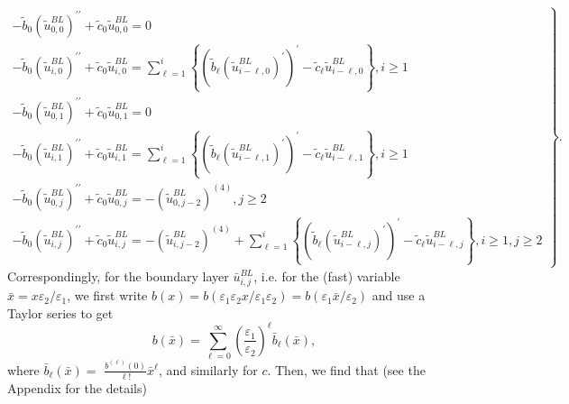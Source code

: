 \documentclass[12pt]{article}
\begin{document}
\begin{equation}
\left. 
\begin{array}{c}
-\tilde{b}_{0}\left(\tilde{u}^{BL}_{0,0}\right)^{\prime \prime }+\tilde{c}_{0}\tilde{u}^{BL}_{0,0}=0 \\
-\tilde{b}_{0}\left(\tilde{u}^{BL}_{i,0}\right)^{\prime \prime }+\tilde{c}_{0}\tilde{u}^{BL}_{i,0}=%
\sum_{\ell =1}^{i}\left\{ \left( \tilde{b}_{\ell }%
\left(\tilde{u}^{BL}_{i-\ell ,0}\right)^{\prime }\right) ^{\prime }-\tilde{c}_{\ell }\tilde{u}^{BL}_{i-\ell ,0}\right\} ,i\geq 1 \\
-\tilde{b}_{0}\left(\tilde{u}^{BL}_{0,1}\right)^{\prime \prime }+\tilde{c}_{0}\tilde{u}^{BL}_{0,1}=0 \\
-\tilde{b}_{0}\left(\tilde{u}^{BL}_{i,1}\right)^{\prime \prime }+\tilde{c}_{0}\tilde{u}^{BL}_{i,1}=%
\sum_{\ell =1}^{i}\left\{ \left( \tilde{b}_{\ell }\left(\tilde{u}^{BL}_{i-\ell ,1}\right)^{\prime }\right) ^{\prime }-\tilde{c}_{\ell }\tilde{u}^{BL}_{i-\ell ,1}\right\} ,i\geq 1 \\
-\tilde{b}_{0}\left(\tilde{u}^{BL}_{0,j}\right)^{\prime \prime }+\tilde{c}_{0}\tilde{u}^{BL}_{0,j}=-\left(\tilde{u}^{BL}_{0,j-2}\right)^{(4)},j\geq 2 \\
-\tilde{b}_{0}\left(\tilde{u}^{BL}_{i,j}\right)^{\prime \prime }+\tilde{c}_{0}\tilde{u}^{BL}_{i,j}=-\left(\tilde{u}^{BL}_{i,j-2}\right)^{(4)}+\sum_{\ell =1}^{i}\left\{ \left( \tilde{b}_{\ell }%
\left(\tilde{u}^{BL}_{i-\ell ,j}\right)^{\prime }\right) ^{\prime }-\tilde{c}_{\ell }\tilde{u}^{BL}_{i-\ell ,j}\right\} ,i\geq 1,j\geq 2%
\end{array}%
\right\}.  \label{ut_ij}
\end{equation}
%
Correspondingly, for the boundary layer $\bar{u}_{i,j}^{BL}$, i.e. for the (fast)
variable $\bar{x}=x\varepsilon _{2}/\varepsilon _{1}$, we first write 
$b(x)=b(\varepsilon _{1}\varepsilon _{2}x/\varepsilon
_{1}\varepsilon _{2})=b(\varepsilon _{1}\bar{x}/\varepsilon _{2})$ and use a Taylor
series to get
%
\begin{equation*}
b(\bar{x})=\sum_{\ell =0}^{\infty } \left( \frac{\varepsilon _{1}}{\varepsilon _{2}}\right) ^{\ell }\bar{b}_{\ell }(\bar{x}),
\end{equation*}
%
where $\bar{b}_{\ell }(\bar{x})=$ $\frac{b^{(\ell )}(0)}{\ell !}\bar{x}^{\ell }$, and
similarly for $c$. Then, we find that (see the Appendix for the details)
%
\end{document}
